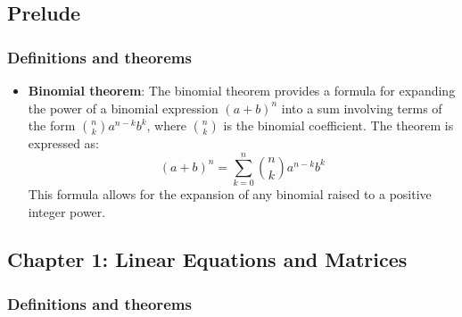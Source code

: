 \documentclass{report}
\begin{document}
    \pagebreak 
    \bigbreak \noindent 
    \subsection{Prelude}
    \bigbreak \noindent 
    \subsubsection{Definitions and theorems}
    \begin{itemize}
        \item \textbf{Binomial theorem}:
            The binomial theorem provides a formula for expanding the power of a binomial expression \((a + b)^n\) into a sum involving terms of the form \(\binom{n}{k} a^{n-k} b^k\), where \(\binom{n}{k}\) is the binomial coefficient. The theorem is expressed as:
            \[
                (a + b)^n = \sum_{k=0}^{n} \binom{n}{k} a^{n-k} b^k
            \]
            This formula allows for the expansion of any binomial raised to a positive integer power.
    \end{itemize}
    \pagebreak 
    \subsection{Chapter 1: Linear Equations and Matrices}
    \bigbreak \noindent 
    \subsubsection{Definitions and theorems}
    \begin{itemize}
        
    \end{itemize}
\end{document}

